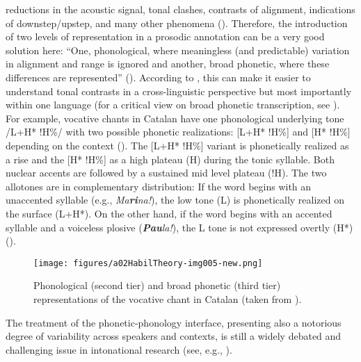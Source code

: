 reductions in the acoustic signal, tonal clashes, contrasts of alignment, indications of downstep/upstep, and many other phenomena (\citealt{ColeShattuck-Hufnagel2016, JunEtAl2015, HualdePrieto2016}). Therefore, the introduction of two levels of representation in a prosodic annotation can be a very good solution here: “One, phonological, where meaningless (and predictable) variation in alignment and range is ignored and another, broad phonetic, where these differences are represented” (\citealt[15]{HualdePrieto2016}). According to \citet{HualdePrieto2016}, this can make it easier to understand tonal contrasts in a cross-linguistic perspective but most importantly within one language (for a critical view on broad phonetic transcription, see \citealt{Arvaniti2016,Arvaniti2022, CangemiGrice2016, ColeShattuck-Hufnagel2016}). For example, vocative chants in Catalan have one phonological underlying tone /L+H* !H\%/ with two possible phonetic realizations: [L+H* !H\%] and [H* !H\%] depending on the context (\citealt[13--14]{HualdePrieto2016}). The [L+H* !H\%] variant is phonetically realized as a rise and the [H* !H\%] as a high plateau (H) during the tonic syllable. Both nuclear accents are followed by a sustained mid level plateau (!H). The two allotones are in complementary distribution: If the word begins with an unaccented syllable (e.g., \textit{Ma}\textbf{\textit{ri}}\textit{na!}), the low tone (L) is phonetically realized on the surface (L+H*). On the other hand, if the word begins with an accented syllable and a voiceless plosive (\textbf{\textit{Pau}}\textit{la!}), the L tone is not expressed overtly (H*) ().




\begin{figure}
\texttt{[image: figures/a02HabilTheory-img005-new.png]}


\caption{Phonological (second tier) and broad phonetic (third tier) representations of the vocative chant in Catalan (taken from \citealt[14]{HualdePrieto2016}).}
\label{fig:2.4}
\end{figure}


The treatment of the phonetic-phonology interface, presenting also a notorious degree of variability across speakers and contexts, is still a widely debated and challenging issue in intonational research (see, e.g., \citealt{Wightman2002, BreenEtAl2012, ColeEtAl2014, ColeShattuck-Hufnagel2016, Pešková2018}).



